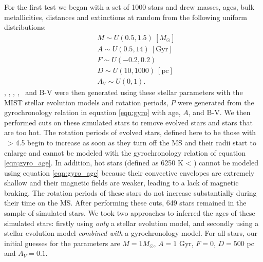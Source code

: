 For the first test we began with a set of 1000 stars and drew masses, ages,
bulk metallicities, distances and extinctions at random from the following
uniform distributions:
\begin{eqnarray}
& M \sim U(0.5, 1.5)~[M_\odot] \\
& A \sim U(0.5, 14)\mathrm{~[Gyr]} \\
& F \sim U(-0.2, 0.2) \\
& D \sim U(10, 1000)~\mathrm{[pc]} \\
& A_V \sim U(0, 1).
\end{eqnarray}
\teff, \logg, \fhat, {\bf \mx}, \pmega\ and B-V were then generated using
these stellar parameters with the MIST stellar evolution models \citep{choi}
and rotation periods, $P$ were generated from the gyrochronology relation in
equation \ref{eqn:gyro} with age, $A$, and B-V.
We then performed cuts on these simulated stars to remove evolved stars and
stars that are too hot.
The rotation periods of evolved stars, defined here to be those with \logg\ >
4.5 begin to increase as soon as they turn off the MS and their radii start to
enlarge and cannot be modeled with the gyrochronology relation of equation
\ref{eqn:gyro_age}.
In addition, hot stars (defined as 6250 K < \teff) cannot be modeled using
equation \ref{eqn:gyro_age} because their convective envelopes are extremely
shallow and their magnetic fields are weaker, leading to a lack of magnetic
braking.
The rotation periods of these stars do not increase substantially during their
time on the MS.
After performing these cuts, 649  stars remained in the
sample of simulated stars.
We took two approaches to inferred the ages of these simulated stars: firstly
using {\it only} a stellar evolution model, and secondly using a stellar
evolution model {\it combined with} a gyrochronology model.
For all stars, our initial guesses for the parameters are $M = 1M_\odot$, $A =
1$ Gyr, $F = 0$, $D = 500$ pc and $A_V = 0.1$.


